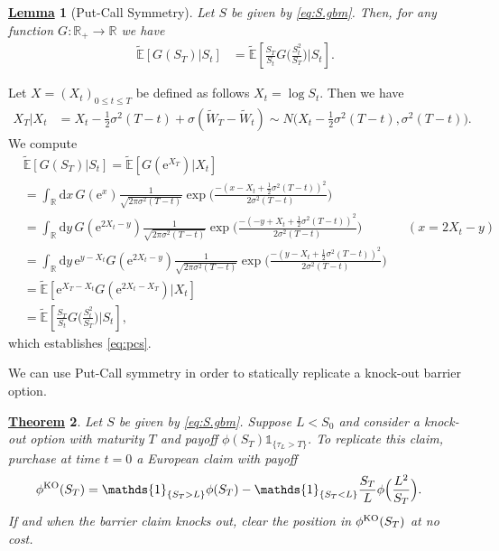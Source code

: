 \documentclass[12pt]{book}
\numberwithin{equation}{chapter}
\theoremstyle{plain}
\newtheorem{theorem}{\underline{Theorem}}
\numberwithin{theorem}{section}
\newtheorem{lemma}[theorem]{\underline{Lemma}}   		%
\theoremstyle{definition}
\numberwithin{exercise}{chapter}
\let\oldendproof\endproof
\renewenvironment{proof}[1][\proofname]{%
  \oldproof[\scshape\underline{#1}]%
}{\oldendproof}
\newcommand{\<}{\langle}
\renewcommand{\>}{\rangle}
\renewcommand{\(}{\left(}
\renewcommand{\)}{\right)}
\renewcommand{\[}{\left[}
\renewcommand{\]}{\right]}
\newcommand\Eb{\mathds{E}}
\newcommand\Rb{\mathds{R}}
\newcommand\Ib{\mathds{1}}
\newcommand\sig{\sigma}
\newcommand\Ebt{\widetilde{\Eb}}
\newcommand\Wt{\widetilde{W}}
\newcommand\dd{\mathrm{d}}
\newcommand\ee{\mathrm{e}}
\newcommand{\blu}[1]{\textcolor{blue}{#1}}
\theoremstyle{definition}
\numberwithin{question}{section}
\begin{document}
\begin{lemma}[Put-Call Symmetry]
Let $S$ be given by \eqref{eq:S.gbm}.
Then, for any function $G: \Rb_+ \to \Rb$ we have
\begin{align}
\Ebt[ G(S_T) | S_t ]
	&=	\Ebt \[ \frac{S_T}{S_t} G \Big( \frac{S_t^2}{S_T} \Big) \Big| S_t \] . \label{eq:pcs}
\end{align}
\end{lemma}

\begin{proof}
Let $X = (X_t)_{0 \leq t \leq T}$ be defined as follows $X_t = \log S_t$.  Then we have
\begin{align}
X_T | X_t
	&=	X_t - \tfrac{1}{2}\sig^2(T-t) + \sig ( \Wt_T - \Wt_t )
	\sim N \Big( X_t - \tfrac{1}{2}\sig^2(T-t) , \sig^2(T-t) \Big).
\end{align}
We compute
\begin{align}
&\Ebt[ G(S_T) | S_t ] 
	 =	\Ebt[ G(\ee^{X_T}) | X_t ] \\
	&=	\int_\Rb \dd x \, G(\ee^x) \frac{1}{\sqrt{2\pi\sig^2(T-t)}} \exp \Big( \frac{-(x - X_t + \tfrac{1}{2} \sig^2(T-t))^2}{2 \sig^2(T-t)} \Big) \\
	&=	\int_\Rb \dd y \, G(\ee^{2 X_t - y}) \frac{1}{\sqrt{2\pi\sig^2(T-t)}} \exp \Big( \frac{-(-y + X_t + \tfrac{1}{2} \sig^2(T-t))^2}{2 \sig^2(T-t)} \Big) && (x = 2X_t - y)\\
	&=	\int_\Rb \dd y \, \ee^{y - X_t} G(\ee^{2 X_t - y}) \frac{1}{\sqrt{2\pi\sig^2(T-t)}} \exp \Big( \frac{-(y - X_t + \tfrac{1}{2} \sig^2(T-t))^2}{2 \sig^2(T-t)} \Big) \\
	&=	\Ebt[ \ee^{X_T - X_t} G(\ee^{2X_t - X_T}) | X_t ] \\
	&=	\Ebt \[ \frac{S_T}{S_t} G \Big( \frac{S_t^2}{S_T} \Big) \Big| S_t \] ,
\end{align}
which establishes \eqref{eq:pcs}.
\end{proof}

\noindent
We can use Put-Call symmetry in order to statically replicate a knock-out barrier option.

\begin{theorem}
\label{thm:static-hedge}
Let $S$ be given by \eqref{eq:S.gbm}.  Suppose $L < S_0$ and consider a knock-out option with maturity $T$ and payoff $\phi(S_T) \Ib_{\{\tau_L > T \}}$.  
To replicate this claim, purchase at time $t=0$ a European claim with payoff
\begin{align}
\phi^\textup{KO}(S_T)
	&=	\Ib_{\{ S_T > L \}} \phi(S_T) - \Ib_{\{ S_T < L \}} \frac{S_T}{L} \phi \Big(\frac{L^2}{S_T} \Big) .
\end{align}
If and when the barrier claim knocks out, clear the position in $\phi^\textup{KO}(S_T)$ at no cost.
\end{theorem}
\end{document}
